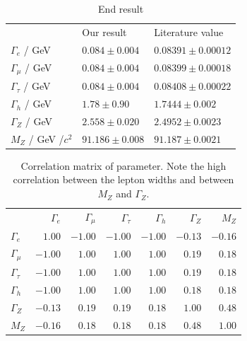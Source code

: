 \begin{table}[htpb]
    \centering
    \caption{End result}
\label{tab:results}
    \begin{tabular}{l l l}
 \rowcolor{LightCyan} & Our result & Literature value \\
 \cellcolor{LightCyan}$\Gamma_e$ / GeV &   $ 0.084\pm0.004   $ & $0.08391 \pm 0.00012 $\\
 \cellcolor{LightCyan}$\Gamma_\mu$ / GeV&   $ 0.084\pm0.004 $ & $0.08399 \pm 0.00018 $\\
 \cellcolor{LightCyan}$\Gamma_\tau$ / GeV&   $ 0.084\pm0.004   $ & $0.08408 \pm 0.00022 $\\
 \cellcolor{LightCyan}$\Gamma_h$ / GeV&   $ 1.78\pm0.90     $ & $1.7444\pm0.002      $\\
 \cellcolor{LightCyan}$\Gamma_Z$ / GeV&   $ 2.558\pm0.020   $ & $2.4952\pm0.0023     $\\
 \cellcolor{LightCyan}$M_Z    $ / GeV /$c^2$&   $ 91.186\pm0.008  $ & $91.187\pm0.0021     $\\
    \end{tabular}
\end{table}

\begin{table}[htpb]
    \centering
    \caption{Correlation matrix of parameter. Note the high correlation between the lepton widths and between $M_Z$ and $\Gamma_Z$.}
    \label{tab:covmat}
\begin{tabular}{l| r| r| r |r | r|r}
\rowcolor{LightCyan} & $\Gamma_e$ & $\Gamma_\mu$ & $\Gamma_\tau$ & $\Gamma_h$ &$\Gamma_Z$ & $M_Z$ \\ 
\cellcolor{LightCyan} $\Gamma_e$ & $1.00$ & $-1.00$ & $-1.00$ & $-1.00$ & $-0.13$ & $-0.16$ \\ 
\cellcolor{LightCyan} $\Gamma_\mu$ & $-1.00$ & $1.00$ & $1.00$ & $1.00$ & $0.19$ & $0.18$ \\ 
\cellcolor{LightCyan} $\Gamma_\tau$ & $-1.00$ & $1.00$ & $1.00$ & $1.00$ & $0.19$ & $0.18$ \\ 
\cellcolor{LightCyan} $\Gamma_h$ & $-1.00$ & $1.00$ & $1.00$ & $1.00$ & $0.18$ & $0.18$ \\ 
\cellcolor{LightCyan} $\Gamma_Z$ & $-0.13$ & $0.19$ & $0.19$ & $0.18$ & $1.00$ & $0.48$ \\ 
\cellcolor{LightCyan} $M_Z$ & $-0.16$ & $0.18$ & $0.18$ & $0.18$ & $0.48$ & $1.00$ \\ 
\end{tabular}



\end{table}
